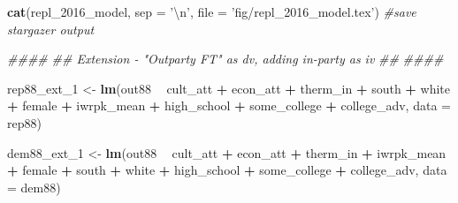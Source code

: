 \documentclass[
]{article}
\newenvironment{Shaded}{\begin{snugshade}}{\end{snugshade}}
\newcommand{\CharTok}[1]{\textcolor[rgb]{0.31,0.60,0.02}{#1}}
\newcommand{\CommentTok}[1]{\textcolor[rgb]{0.56,0.35,0.01}{\textit{#1}}}
\newcommand{\DataTypeTok}[1]{\textcolor[rgb]{0.13,0.29,0.53}{#1}}
\newcommand{\DecValTok}[1]{\textcolor[rgb]{0.00,0.00,0.81}{#1}}
\newcommand{\KeywordTok}[1]{\textcolor[rgb]{0.13,0.29,0.53}{\textbf{#1}}}
\newcommand{\NormalTok}[1]{#1}
\newcommand{\OperatorTok}[1]{\textcolor[rgb]{0.81,0.36,0.00}{\textbf{#1}}}
\newcommand{\StringTok}[1]{\textcolor[rgb]{0.31,0.60,0.02}{#1}}
\begin{document}
\begin{Shaded}
\begin{Highlighting}[]
\KeywordTok{cat}\NormalTok{(repl_}\DecValTok{2016}\NormalTok{_model, }\DataTypeTok{sep =} \StringTok{'}\CharTok{\textbackslash{}n}\StringTok{'}\NormalTok{, }\DataTypeTok{file =} \StringTok{'fig/repl_2016_model.tex'}\NormalTok{) }\CommentTok{#save stargazer output}



\CommentTok{####}
\CommentTok{## Extension - "Outparty FT" as dv, adding in-party as iv}
\CommentTok{##}
\CommentTok{####}



\NormalTok{rep88_ext_}\DecValTok{1}\NormalTok{ <-}\StringTok{ }\KeywordTok{lm}\NormalTok{(out88 }\OperatorTok{~}\StringTok{ }\NormalTok{cult_att }\OperatorTok{+}\StringTok{ }\NormalTok{econ_att }\OperatorTok{+}\StringTok{ }\NormalTok{therm_in }\OperatorTok{+}
\StringTok{                                        }\NormalTok{south }\OperatorTok{+}\StringTok{ }\NormalTok{white }\OperatorTok{+}\StringTok{ }\NormalTok{female }\OperatorTok{+}
\StringTok{                                        }\NormalTok{iwrpk_mean }\OperatorTok{+}
\StringTok{                                        }\NormalTok{high_school }\OperatorTok{+}\StringTok{ }\NormalTok{some_college }\OperatorTok{+}\StringTok{ }\NormalTok{college_adv, }\DataTypeTok{data =}\NormalTok{ rep88)}

\NormalTok{dem88_ext_}\DecValTok{1}\NormalTok{ <-}\StringTok{ }\KeywordTok{lm}\NormalTok{(out88 }\OperatorTok{~}\StringTok{ }\NormalTok{cult_att }\OperatorTok{+}\StringTok{ }\NormalTok{econ_att }\OperatorTok{+}\StringTok{ }\NormalTok{therm_in  }\OperatorTok{+}\StringTok{ }\NormalTok{iwrpk_mean }\OperatorTok{+}
\StringTok{                                        }\NormalTok{female }\OperatorTok{+}\StringTok{ }\NormalTok{south }\OperatorTok{+}\StringTok{ }\NormalTok{white }\OperatorTok{+}
\StringTok{                                        }\NormalTok{high_school }\OperatorTok{+}\StringTok{ }\NormalTok{some_college }\OperatorTok{+}\StringTok{ }\NormalTok{college_adv, }\DataTypeTok{data =}\NormalTok{ dem88)}


\end{Highlighting}
\end{Shaded}
\end{document}
